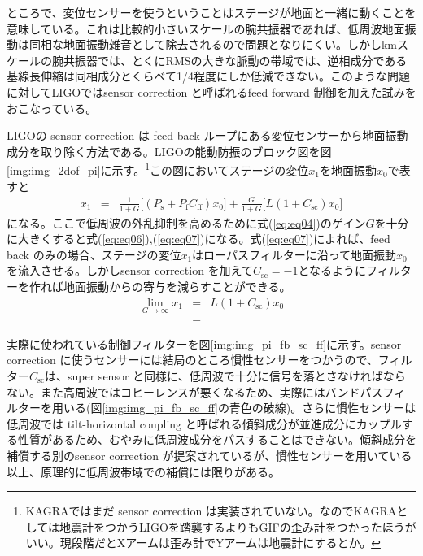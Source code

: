 \documentclass[a4paper,12pt]{jsarticle}
\begin{document}
ところで、変位センサーを使うということはステージが地面と一緒に動くことを意味している。これは比較的小さいスケールの腕共振器であれば、低周波地面振動は同相な地面振動雑音として除去されるので問題となりにくい。しかしkmスケールの腕共振器では、とくにRMSの大きな脈動の帯域では、逆相成分である基線長伸縮は同相成分とくらべて1/4程度にしか低減できない\cite{miyo2018cdmr}。このような問題に対してLIGOではsensor correction と呼ばれるfeed forward 制御を加えた試みをおこなっている\cite{hua2005low}\cite{matichard2015seismic}。


LIGOの sensor correction は feed back ループにある変位センサーから地面振動成分を取り除く方法である。LIGOの能動防振のブロック図を図\ref{img:img_2dof_pi}に示す。\footnote{KAGRAではまだ sensor correction は実装されていない。なのでKAGRAとしては地震計をつかうLIGOを踏襲するよりもGIFの歪み計をつかったほうがいい。現段階だとXアームは歪み計でYアームは地震計にするとか。}この図においてステージの変位$x_1$を地面振動$x_0$で表すと
\begin{eqnarray} \label{eq:eq04}
  x_1 &=& \frac{1}{1+G}\Biggl[(P_{\mathrm{s}}+P_{\mathrm{f}}C_{\mathrm{ff}})x_0\Biggl]
  + \frac{G}{1+G}\Biggl[L(1+C_{\mathrm{sc}})x_0\Biggl]
\end{eqnarray}
になる。ここで低周波の外乱抑制を高めるために式(\ref{eq:eq04})のゲイン$G$を十分に大きくすると式(\ref{eq:eq06}),(\ref{eq:eq07})になる。式(\ref{eq:eq07})によれば、feed back のみの場合、ステージの変位$x_1$はローパスフィルターに沿って地面振動$x_0$を流入させる。しかしsensor correction を加えて$C_{\mathrm{sc}}=-1$となるようにフィルターを作れば地面振動からの寄与を減らすことができる。
\begin{eqnarray}\label{eq:eq06}
  \lim_{G \to \infty} x_{1} &=& L(1+C_{\mathrm{sc}})x_0 \\
  &=&
\end{eqnarray}

実際に使われている制御フィルターを図\ref{img:img_pi_fb_sc_ff}に示す。sensor correction に使うセンサーには結局のところ慣性センサーをつかうので、フィルター$C_{\mathrm{sc}}$は、super sensor と同様に、低周波で十分に信号を落とさなければならない。また高周波ではコヒーレンスが悪くなるため、実際にはバンドパスフィルターを用いる(図\ref{img:img_pi_fb_sc_ff}の青色の破線)。さらに慣性センサーは低周波では tilt-horizontal coupling と呼ばれる傾斜成分が並進成分にカップルする性質があるため、むやみに低周波成分をパスすることはできない。傾斜成分を補償する別のsensor correction が提案されているが\cite{biscansD2018}、慣性センサーを用いている以上、原理的に低周波帯域での補償には限りがある。
\end{document}
